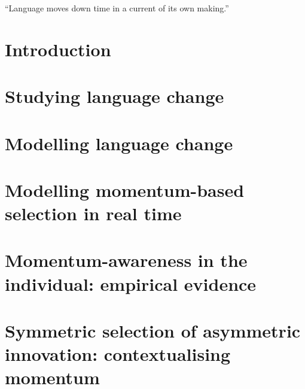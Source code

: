 \documentclass[oneside]{book}
\begin{document}
\tableofcontents

\listoffigures
\listoftables

\newpage
\thispagestyle{empty}
\epigraph{``Language moves down time in a current of its own making.''}{\citep[p.160]{Sapir1921}}

\mainmatter

\chapter{Introduction}
\label{ch:intro}


\chapter{Studying language change}
\label{ch:review}


\chapter{Modelling language change}
\label{ch:modelling}


\chapter[Modelling momentum-based selection]{Modelling momentum-based selection in real time}
\label{ch:momentummodel}


\chapter[Momentum-awareness in the individual]{Momentum-awareness in the individual: empirical evidence}
\label{ch:questionnaire}


\chapter[Symmetric selection of asymmetric innovation]{Symmetric selection of asymmetric innovation: contextualising momentum}
\label{ch:bigpicture}
\label{ch:conclusion}

\end{document}
